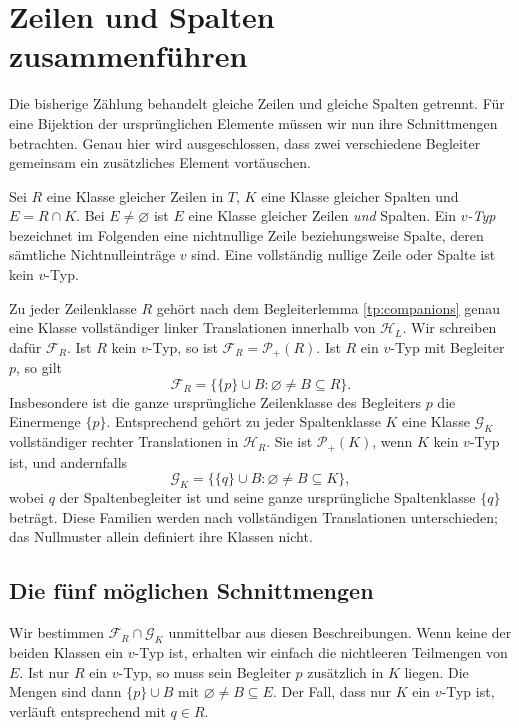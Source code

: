 \documentclass[a4paper,11pt]{article}
\newcommand{\Pp}[1]{\mathcal P_+(#1)}
\newcommand{\HL}{\mathcal H_L}
\newcommand{\HR}{\mathcal H_R}
\theoremstyle{remark}
\begin{document}
\section{Zeilen und Spalten zusammenführen}
\label{tp:joint-classes}

Die bisherige Zählung behandelt gleiche Zeilen und gleiche Spalten
getrennt. Für eine Bijektion der ursprünglichen Elemente müssen wir nun
ihre Schnittmengen betrachten. Genau hier wird ausgeschlossen, dass zwei
verschiedene Begleiter gemeinsam ein zusätzliches Element vortäuschen.

Sei $R$ eine Klasse gleicher Zeilen in $T$, $K$ eine Klasse gleicher
Spalten und $E=R\cap K$. Bei $E\ne\varnothing$ ist $E$ eine Klasse
gleicher Zeilen \emph{und} Spalten. Ein \emph{$v$-Typ} bezeichnet im
Folgenden eine nichtnullige Zeile beziehungsweise Spalte, deren sämtliche
Nichtnulleinträge $v$ sind. Eine vollständig nullige Zeile oder Spalte ist
kein $v$-Typ.

Zu jeder Zeilenklasse $R$ gehört nach dem Begleiterlemma
\ref{tp:companions} genau eine Klasse vollständiger linker Translationen
innerhalb von $\HL$. Wir schreiben dafür $\mathcal F_R$. Ist $R$ kein
$v$-Typ, so ist $\mathcal F_R=\Pp{R}$. Ist $R$ ein $v$-Typ mit
Begleiter $p$, so gilt
\[
 \mathcal F_R=
 \bigl\{\{p\}\cup B:\varnothing\ne B\subseteq R\bigr\}.
\]
Insbesondere ist die ganze ursprüngliche Zeilenklasse des Begleiters
$p$ die Einermenge $\{p\}$. Entsprechend gehört zu jeder Spaltenklasse
$K$ eine Klasse $\mathcal G_K$ vollständiger rechter Translationen in
$\HR$. Sie ist $\Pp{K}$, wenn $K$ kein $v$-Typ ist, und andernfalls
\[
 \mathcal G_K=
 \bigl\{\{q\}\cup B:\varnothing\ne B\subseteq K\bigr\},
\]
wobei $q$ der Spaltenbegleiter ist und seine ganze ursprüngliche
Spaltenklasse $\{q\}$ beträgt. Diese Familien werden nach vollständigen
Translationen unterschieden; das Nullmuster allein definiert ihre Klassen
nicht.

\subsection{Die fünf möglichen Schnittmengen}

Wir bestimmen $\mathcal F_R\cap\mathcal G_K$ unmittelbar aus diesen
Beschreibungen. Wenn keine der beiden Klassen ein $v$-Typ ist, erhalten
wir einfach die nichtleeren Teilmengen von $E$. Ist nur $R$ ein $v$-Typ,
so muss sein Begleiter $p$ zusätzlich in $K$ liegen. Die Mengen sind dann
$\{p\}\cup B$ mit $\varnothing\ne B\subseteq E$. Der Fall, dass nur
$K$ ein $v$-Typ ist, verläuft entsprechend mit $q\in R$.
\end{document}
